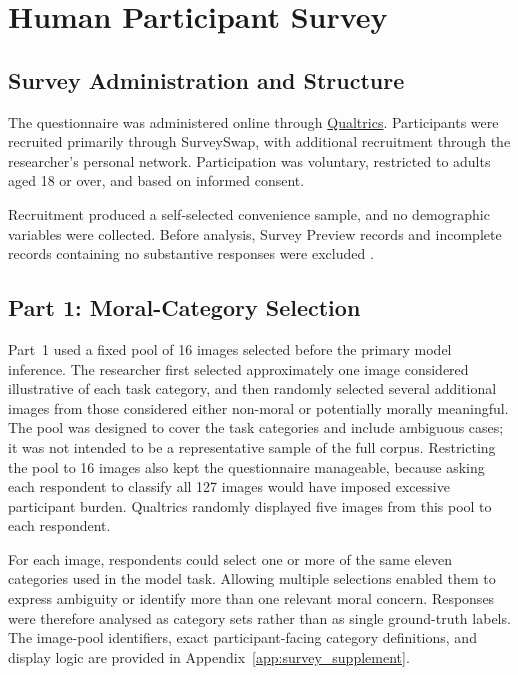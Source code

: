 \section{Human Participant Survey}
\label{sec:human_survey}

\subsection{Survey Administration and Structure}
\label{subsec:survey_sample}
\label{subsec:survey_structure}

The questionnaire was administered online through
\href{https://qualtrics.ucl.ac.uk/jfe/form/SV_2aanTCkqVUzUcMC}{Qualtrics}.
Participants were recruited primarily through SurveySwap, with additional
recruitment through the researcher's personal network. Participation was
voluntary, restricted to adults aged 18 or over, and based on informed
consent. 

Recruitment produced a self-selected convenience sample, and no demographic
variables were collected. Before analysis, Survey Preview records and
incomplete records containing no substantive responses were excluded
\cite{eysenbach2004cherries}.

\subsection{Part 1: Moral-Category Selection}
\label{subsec:survey_part1}

Part~1 used a fixed pool of 16 images selected before the primary model
inference. The researcher first selected approximately one image considered
illustrative of each task category, and then randomly selected several
additional images from those considered either non-moral or potentially
morally meaningful. The pool was designed to cover the task categories and
include ambiguous cases; it was not intended to be a representative sample of
the full corpus. Restricting the pool to 16 images also kept the questionnaire
manageable, because asking each respondent to classify all 127 images would
have imposed excessive participant burden. Qualtrics randomly displayed five
images from this pool to each respondent.

For each image, respondents could select one or more of the same eleven
categories used in the model task. Allowing multiple selections enabled them
to express ambiguity or identify more than one relevant moral concern.
Responses were therefore analysed as category sets rather than as single
ground-truth labels. The image-pool identifiers, exact participant-facing
category definitions, and display logic are provided in
Appendix~\ref{app:survey_supplement}.


